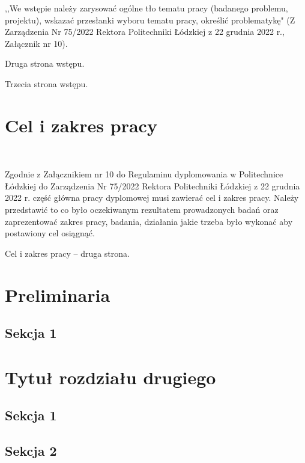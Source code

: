 \documentclass[a4paper,12pt,twoside,polish]{book}
\theoremstyle{definition}
\theoremstyle{plain}
\theoremstyle{definition}
\begin{document}
,,We wstępie należy zarysować ogólne tło tematu pracy (badanego problemu, projektu), wskazać przesłanki wyboru tematu pracy, określić problematykę" (Z Zarządzenia Nr 75/2022 Rektora Politechniki Łódzkiej z 22 grudnia 2022 r., Załącznik nr 10).









\newpage
Druga strona wstępu. 

\newpage
Trzecia strona wstępu.

\chapter*{Cel i zakres pracy} %
\     %

Zgodnie z Załącznikiem nr 10 do Regulaminu dyplomowania w Politechnice Łódzkiej do Zarządzenia Nr 75/2022 Rektora Politechniki Łódzkiej z 22 grudnia 2022 r. część główna pracy dyplomowej musi zawierać cel i zakres pracy. Należy przedstawić to co było oczekiwanym rezultatem prowadzonych badań oraz zaprezentować zakres pracy, badania, działania jakie trzeba było wykonać aby postawiony cel osiągnąć. 

\newpage
Cel i zakres pracy -- druga strona.


\chapter{Preliminaria}\label{pre}


\section{Sekcja 1}
  


\chapter{Tytuł rozdziału drugiego}

\section{Sekcja 1}

\section{Sekcja 2}
\end{document}
